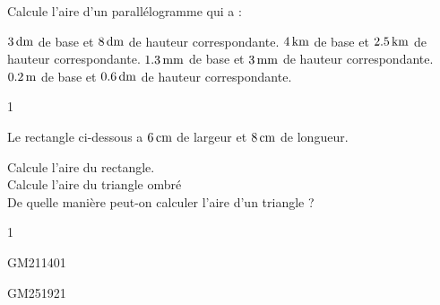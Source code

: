 \documentclass[a4paper,11pt]{report}
\let\oldcenter\center
\let\oldendcenter\endcenter
\renewenvironment{center}{\setlength\topsep{-10pt}\oldcenter}{\oldendcenter}
\begin{document}
\begin{exo}{    %
Calcule l'aire d'un parallélogramme qui a :
\begin{tasks}
	\task $\tunit{3}{dm}$ de base et $\tunit{8}{dm}$ de hauteur correspondante.
	\task $\tunit{4}{km}$ de base et $\tunit{2,5}{km}$ de hauteur correspondante.
	\task $\tunit{1,3}{mm}$ de base et $\tunit{3}{mm}$ de hauteur correspondante.
	\task $\tunit{0,2}{m}$ de base et $\tunit{0,6}{dm}$ de hauteur correspondante.
\end{tasks}
}{1}
\end{exo}




\begin{exop}{
		Le rectangle ci-dessous a $\tunit{6}{cm}$ de largeur et $\tunit{8}{cm}$ de longueur.\\
\begin{center}
\end{center}
\begin{tasks}
    \task Calcule l'aire du rectangle. \smallskip \\ 
    \task Calcule l'aire du triangle ombré \smallskip \\ 
    \task De quelle manière peut-on calculer l'aire d'un triangle ? \smallskip \\ 
\end{tasks}
}{1} 
\end{exop}

\begin{exol}{GM21}{140}{1}      %
\end{exol}



\begin{exof}{GM25}{192}{1}      %
\end{exof}
\end{document}
